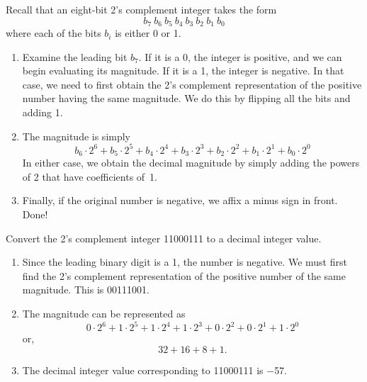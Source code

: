 \documentclass{patt}
\begin{document}
Recall that an eight-bit 2's complement integer takes the form
\begin{equation*}
b_7\ b_6\ b_5\ b_4\ b_3\ b_2\ b_1\ b_0
\end{equation*}
where each of the bits $b_i$ is either 0 or 1.
\begin{enumerate}
\item Examine the leading bit $b_7$. If it is a 0, the integer is
  positive, and we can begin evaluating its magnitude.  If it is a 1,
  the integer is negative.  In that case, we need to first obtain the
  2's complement representation of the positive number having the same
  magnitude.  We do this by flipping all the bits and adding 1.

\item The magnitude is simply
\begin{equation*}
b_6\cdot 2^6+b_5\cdot 2^5+b_4\cdot 2^4+b_3\cdot 2^3+b_2\cdot 2^2+b_1\cdot 2^1+b_0\cdot 2^0
\end{equation*}
In either case, we obtain the decimal magnitude by simply adding 
the powers of 2 that have coefficients of~1.

\item Finally, if the original number is negative, we affix a minus
  sign in front. Done!
\end{enumerate}
\removelastskip
\pagebreak

\begin{example}
  Convert the 2's complement integer 11000111 to a decimal integer
  value.

  \begin{enumerate}
  \item Since the leading binary digit is a 1, the number is negative.
    We must first find the 2's complement representation of the
    positive number of the same magnitude.  This is 00111001.

  \item The magnitude can be represented as
    \begin{equation*}
      0\cdot 2^6+1\cdot 2^5+1\cdot 2^4+1\cdot 2^3+0\cdot 2^2+0\cdot 2^1+1\cdot 2^0
    \end{equation*}
    or,
    \begin{equation*}
      32+16+8+1.
    \end{equation*}

  \item The decimal integer value corresponding to 11000111 is $-$57.
\end{enumerate}
\end{example}
\end{document}
